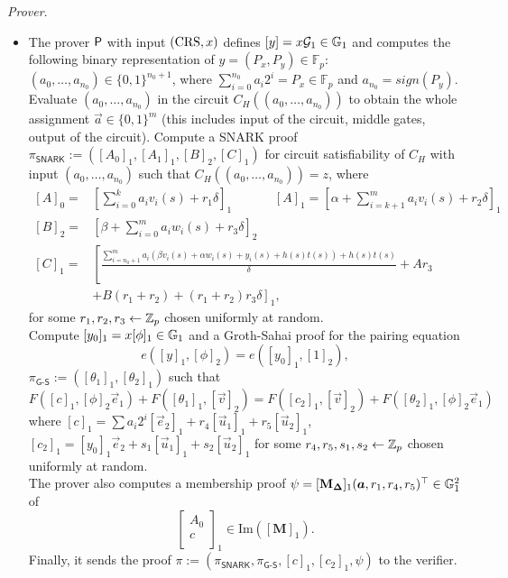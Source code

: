 \noindent \textit{Prover}. 
\begin{itemize}
	\item The prover $\mathsf{P}$ with input $(\textnormal{CRS},x)$ defines $[y]=x\mathcal{G}_1 \in \mathbb{G}_1$ and computes the following binary representation of $y= (P_x, P_y) \in \mathbb{F}_p$:
	$(a_{0},\dots,a_{n_0}) \in \{0,1\}^{n_0+1}$, where $\sum_{i=0}^{n_0} a_i 2^i=P_x\in \mathbb{F}_p$ and $a_{n_0} = sign(P_y)$.\\
	Evaluate $(a_{0},\dots,a_{n_0})$ in the circuit $C_H((a_{0},\dots,a_{n_0}))$ to obtain the whole assignment $\vec{a}\in \{0,1\}^m$ (this includes input of the circuit, middle gates, output of the circuit). Compute a SNARK proof $\pi_{\textsf{SNARK}}:=([A_0]_1,[A_1]_1,[B]_2,[C]_1)$ for circuit satisfiability of $C_H$ with input $(a_0,\dots,a_{n_0})$ such that $C_H((a_0,\dots,a_{n_0}))=z$, where
	\[\begin{split}
	[A]_0 = &\left[\sum_{i=0}^k a_i v_i(s) + r_1 \delta\right]_1  \hspace{40pt} [A]_1=\left[\alpha + \sum_{i=k+1}^m a_i v_i(s) + r_2 \delta\right]_1\\
	[B]_2 = &\left[\beta + \sum_{i=0}^m a_i w_i(s) + r_3 \delta\right]_2\\
	[C]_1 = &\left[\frac{\sum_{i=n_0+1}^m a_i\left(\beta v_i(s)+\alpha w_i(s)+y_i(s)+h(s)t(s)\right)+h(s)t(s)}{\delta}+Ar_3\right.\\
	&\left.+B (r_1+r_2)+ (r_1+r_2)r_3\delta\right]_1,
	\end{split}\]
	for some $r_1,r_2,r_3 \gets \mathbb{Z}_p$ chosen uniformly at random.\\
	Compute $[y_0]_1=x[\phi]_1\in\mathbb{G}_1$ and a Groth-Sahai proof for the pairing equation
	\begin{equation}\label{GS1}
	e([y]_1,[\phi]_2)=e([y_0]_1,[1]_2),
	\end{equation}
	$\pi_{\textsf{G-S}}:=([\theta_1]_1,[\theta_2]_1)$ such that
	\begin{equation}\label{GS2}
	F([c]_1,[\phi]_2\vec{e}_1)+F([\theta_1]_1,[\vec{v}]_2) = F([c_2]_1,[\vec{v}]_2)+F([\theta_2]_1,[\phi]_2\vec{e}_1)
	\end{equation}
	where $[c]_1=\sum a_i 2^i [\vec{e}_2]_1+r_4[\vec{u}_1]_1 + r_5[\vec{u}_2]_1$, $[c_2]_1 = [y_0]_1\vec{e}_2 + s_1[\vec{u}_1]_1+s_2[\vec{u}_2]_1$ for some $r_4,r_5,s_1,s_2\gets \mathbb{Z}_p$ chosen uniformly at random.\\
	The prover also computes a membership proof $\psi=[\mathbf{M}_{\mathbf{\Delta}}]_1(\vec{a},r_1,r_4,r_5)^{\top}\in \G_1^{2}$ of 
	$$\left[\begin{array}{c}
	A_0\\
	c\\
	\end{array}\right]_1 \in \text{Im}\left(\left[\mathbf{M}\right]_1\right).$$	
	Finally, it sends the proof $\pi:= \left(\pi_{\textsf{SNARK}}, \pi_{\textsf{G-S}},[c]_1,[c_2]_1,\psi\right)$ to the verifier.
\end{itemize}

